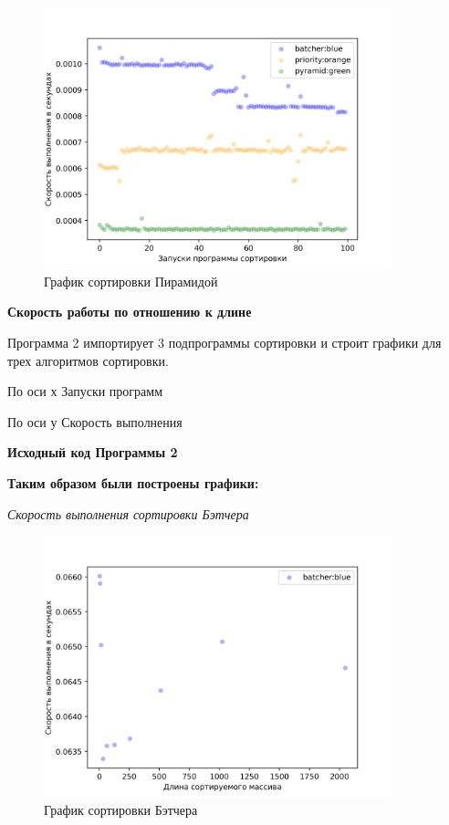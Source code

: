 \begin{figure}[H]
    \centering
    \includegraphics[width=0.9\textwidth]{./plots/bitonic_speed.png}
    \caption{График сортировки Пирамидой}
\end{figure}



\begin{center}
    \textbf{Скорость работы по отношению к длине}
\end{center}



Программа 2 импортирует 3 подпрограммы сортировки и строит графики для трех алгоритмов сортировки.

По оси х Запуски программ

По оси у Скорость выполнения 

\textbf{Исходный код Программы 2}




\textbf{Таким образом были построены графики:}

\textit{Скорость выполнения сортировки Бэтчера}

\begin{figure}[H]
    \centering
    \includegraphics[width=0.9\textwidth]{./plots/batcher_speed_delta.png}
    \caption{График сортировки Бэтчера}
\end{figure}


